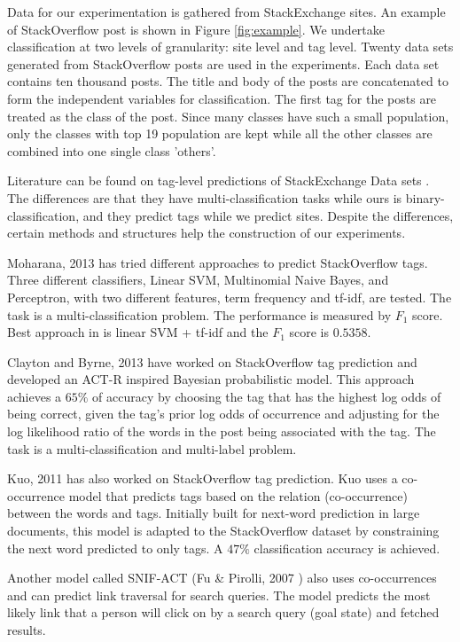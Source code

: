\documentclass{sig-alternate-05-2015}
\begin{document}
Data for our experimentation is gathered from StackExchange sites. An example of StackOverflow post is shown in Figure \ref{fig:example}. We undertake classification at two levels of granularity: site level and tag level. Twenty data sets generated from StackOverflow posts are used in the experiments. Each data set contains ten thousand posts. The title and body of the posts are concatenated to form the independent variables for classification. The first tag for the posts are treated as the class of the post. Since many classes have such a small population, only the classes with top 19 population are kept while all the other classes are combined into one single class 'others'.

Literature can be found on tag-level predictions of StackExchange Data sets \cite{moharanatag,stanley2013predicting,kuo2011word}. The differences are that they have multi-classification tasks while ours is binary-classification, and they predict tags while we predict sites. Despite the differences, certain methods and structures help the construction of our experiments.

Moharana, 2013 \cite{moharanatag} has tried different approaches to predict StackOverflow tags. Three different classifiers, Linear SVM, Multinomial Naive Bayes, and Perceptron, with two different features, term frequency and tf-idf, are tested. The task is a multi-classification problem. The performance is measured by $F_{1}$ score. Best approach in \cite{moharanatag} is linear SVM + tf-idf and the $F_{1}$ score is $0.5358$.

Clayton and Byrne, 2013 \cite{stanley2013predicting} have worked on StackOverflow tag prediction and developed an ACT-R inspired Bayesian probabilistic model. This approach achieves a $65\%$ of accuracy by choosing the tag that has the highest log odds of being correct, given the tag's prior log odds of occurrence and adjusting for the log likelihood ratio of the words in the post being associated with the tag. The task is a multi-classification and multi-label problem.

Kuo, 2011 \cite{kuo2011word} has also worked on StackOverflow tag prediction. Kuo uses a co-occurrence model that predicts tags based on the relation (co-occurrence) between the words and tags. Initially built for next-word prediction in large documents, this model is adapted to the StackOverflow dataset by constraining the next word predicted to only tags. A $47\%$ classification accuracy is achieved.

Another model called SNIF-ACT (Fu \& Pirolli, 2007 \cite{fu2007snif}) also uses co-occurrences and can predict link traversal for search queries. The model predicts the most likely link that a person will click on by a search query (goal state) and fetched results. 
\end{document}
